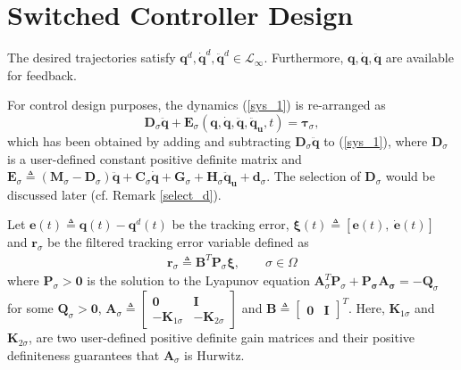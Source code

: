 \section{Switched Controller Design}
\begin{assum}\label{assm2}
	The desired trajectories satisfy $\mathbf{q}^d,\dot{\mathbf q}^d, \ddot{\mathbf q}^d \in \mathcal{L}_{\infty}$. Furthermore, $\mathbf{q}, \dot{\mathbf{q}},\ddot{\mathbf q}$ are available for feedback.
\end{assum}
For control design purposes, the dynamics (\ref{sys_1}) is re-arranged as
\begin{equation}\label{sys_2}
\mathbf D_\sigma \ddot{ \mathbf q}+\mathbf E_{\sigma}(\mathbf q,\dot{\mathbf q}, \ddot{\mathbf q},\ddot{\mathbf q}_{\mathbf u},t)=\boldsymbol \tau_{\sigma},
\end{equation} 
which has been obtained by adding and subtracting $\mathbf{D}_\sigma \ddot{\mathbf q}$ to (\ref{sys_1}), where $\mathbf D_\sigma$ is a user-defined constant positive definite matrix and $\mathbf E_{\sigma} \triangleq (\mathbf M_{\sigma}-\mathbf D_\sigma)\ddot{ \mathbf q}+\mathbf C_{\sigma}\dot{\mathbf q}+\mathbf G_{\sigma}+ \mathbf{H}_\sigma\ddot{ \mathbf{q}}_{\mathbf u}+\mathbf{ d}_{\sigma}$. The selection of $\mathbf D_\sigma$ would be discussed later (cf. Remark \ref{select_d}). %


Let $\mathbf {e}(t) \triangleq \mathbf q(t)-\mathbf {q}^d(t)$ be the tracking error, $\boldsymbol \xi (t) \triangleq [\mathbf e(t),~\dot{\mathbf {e}}(t)]$ and $\mathbf r_{\sigma}$ be the filtered tracking error variable defined as
\begin{align}
\mathbf{r}_{\sigma} \triangleq \mathbf{B}^T \mathbf{P}_{\sigma} \boldsymbol \xi, \qquad \sigma \in \Omega \label{r}
\end{align}
where $\mathbf{P}_{\sigma}  >\mathbf 0$ is the solution to the Lyapunov equation $\mathbf{A}_{\sigma}^T \mathbf P_{\sigma} + \mathbf {P_{\sigma} A_{\sigma}}= -\mathbf Q_{\sigma}$ for some $\mathbf{Q}_{\sigma} >\mathbf 0$, $\mathbf A_{\sigma} \triangleq \begin{bmatrix}
\mathbf 0 & \mathbf I\\ 
- \mathbf K_{1\sigma}&  - \mathbf K_{2\sigma}
\end{bmatrix}$ and $\mathbf B \triangleq \begin{bmatrix}
\mathbf 0 &
\mathbf I
\end{bmatrix}^T$. Here, $\mathbf K_{1\sigma}$ and $\mathbf K_{2\sigma}$, are two user-defined positive definite gain matrices and their positive definiteness guarantees that $\mathbf{A}_{\sigma}$ is Hurwitz.

